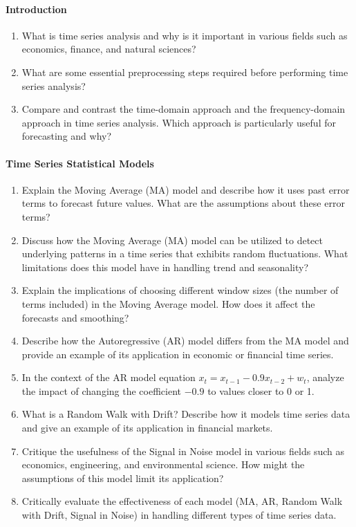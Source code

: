 \paragraph*{Introduction}
\begin{enumerate}[nosep]
    \item What is time series analysis and why is it important in various fields such as economics, finance, and natural sciences?
    \item What are some essential preprocessing steps required before performing time series analysis?
    \item Compare and contrast the time-domain approach and the frequency-domain approach in time series analysis. Which approach is particularly useful for forecasting and why?
\end{enumerate}
\paragraph*{Time Series Statistical Models}
\begin{enumerate}
    \item Explain the Moving Average (MA) model and describe how it uses past error terms to forecast future values. What are the assumptions about these error terms?
    \item Discuss how the Moving Average (MA) model can be utilized to detect underlying patterns in a time series that exhibits random fluctuations. What limitations does this model have in handling trend and seasonality?
    \item Explain the implications of choosing different window sizes (the number of terms included) in the Moving Average model. How does it affect the forecasts and smoothing?
    \item Describe how the Autoregressive (AR) model differs from the MA model and provide an example of its application in economic or financial time series.
    \item In the context of the AR model equation $x_t = x_{t-1} - 0.9 x_{t-2} + w_t$, analyze the impact of changing the coefficient $-0.9$ to values closer to 0 or 1.
    \item What is a Random Walk with Drift? Describe how it models time series data and give an example of its application in financial markets.
    \item Critique the usefulness of the Signal in Noise model in various fields such as economics, engineering, and environmental science. How might the assumptions of this model limit its application?
    \item Critically evaluate the effectiveness of each model (MA, AR, Random Walk with Drift, Signal in Noise) in handling different types of time series data.
\end{enumerate}
